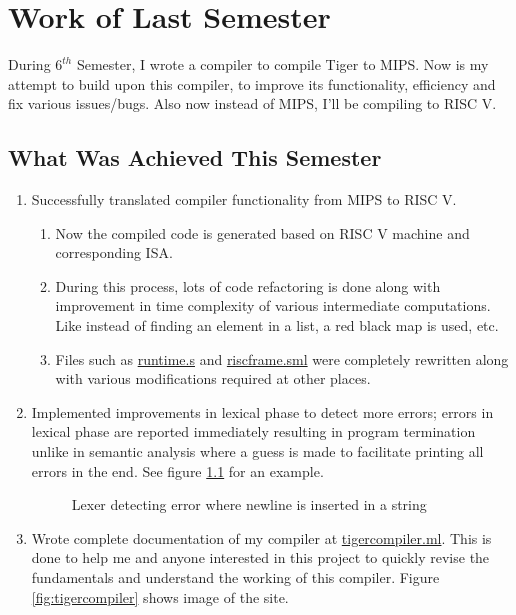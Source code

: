 \chapter{Work of Last Semester}
\hspace{3mm}

During $6^{th}$ Semester, I wrote a compiler to compile Tiger to MIPS. Now is my attempt to build upon this compiler, to improve its functionality, efficiency and fix various issues/bugs. Also now instead of MIPS, I'll be compiling to RISC V.

\section{What Was Achieved This Semester}

\begin{enumerate}
  \item Successfully translated compiler functionality from MIPS to RISC V.
    \begin{enumerate} 
      \item Now the compiled code is generated based on RISC V machine and corresponding ISA.
      \item During this process, lots of code refactoring is done along with improvement in time complexity of various intermediate computations. Like instead of finding an element in a list, a red black map is used, etc.  
      \item Files such as \href{https://github.com/sourabh2311/btp/blob/master/Compiler/runtime.s}{runtime.s} and \href{https://github.com/sourabh2311/btp/blob/master/Compiler/riscframe.sml}{riscframe.sml} were completely rewritten along with various modifications required at other places.
    \end{enumerate}
  \item Implemented improvements in lexical phase to detect more errors; errors in lexical phase are reported immediately resulting in program termination unlike in semantic analysis where a guess is made to facilitate printing all errors in the end. See figure \ref{fig:lexError} for an example.
    \begin{figure}
    \centering
    \caption{Lexer detecting error where newline is inserted in a string}
    \label{fig:lexError}
    \end{figure}
  \item Wrote complete documentation of my compiler at \href{https://tigercompiler.ml}{tigercompiler.ml}. This is done to help me and anyone interested in this project to quickly revise the fundamentals and understand the working of this compiler. Figure \ref{fig:tigercompiler} shows image of the site.

\end{enumerate}
